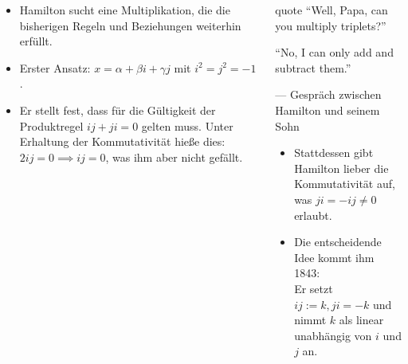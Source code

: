 \documentclass[aspectratio=169]{beamer}
\begin{document}
    \begin{frame}
    \begin{columns}
    \begin{column}{0.5\textwidth}
        \begin{itemize}
            \item<1->
                Hamilton sucht eine Multiplikation, die die bisherigen Regeln und Beziehungen weiterhin erfüllt.

            \item<2->
                Erster Ansatz: \(x = \alpha + \beta i + \gamma j\) mit \(i^2 = j^2 = -1\).

            \item<3->
                Er stellt fest, dass für die Gültigkeit der Produktregel \(ij + ji = 0\) gelten muss.
                Unter Erhaltung der Kommutativität hieße dies: \(2ij = 0 \implies ij = 0\), was ihm aber nicht gefällt.
        \end{itemize}
    \end{column}
    \begin{column}{0.5\textwidth}
        \begin{beamercolorbox}[wd=\textwidth, rounded=true, shadow=true]{quote}
            \enquote{Well, Papa, can you multiply triplets?}

            \enquote{No, I can only add and subtract them.}

            \vspace{2mm}
            \hfill {\scriptsize--- Gespräch zwischen Hamilton und seinem Sohn}
        \end{beamercolorbox}

        \begin{itemize}
            \item<4->
                Stattdessen gibt Hamilton lieber die Kommutativität auf, was \(ji = -ij \neq 0\) erlaubt.

            \item<5->
                Die entscheidende Idee kommt ihm 1843:\\
                Er setzt \(ij := k, ji = -k\) und nimmt  \(k\) als linear unabhängig von \(i\) und \(j\) an.
        \end{itemize}
        \vfill
    \end{column}
    \end{columns}
    \end{frame}
\end{document}
